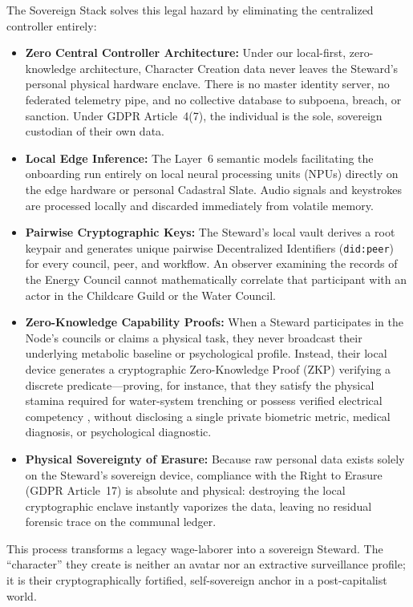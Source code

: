 The Sovereign Stack solves this legal hazard by eliminating the centralized controller entirely:
\begin{itemize}
    \item \textbf{Zero Central Controller Architecture:} Under our local-first, zero-knowledge architecture, Character Creation data never leaves the Steward's personal physical hardware enclave. There is no master identity server, no federated telemetry pipe, and no collective database to subpoena, breach, or sanction. Under GDPR Article~4(7), the individual is the sole, sovereign custodian of their own data.
    \item \textbf{Local Edge Inference:} The Layer~6 semantic models facilitating the onboarding run entirely on local neural processing units (NPUs) directly on the edge hardware or personal Cadastral Slate. Audio signals and keystrokes are processed locally and discarded immediately from volatile memory.
    \item \textbf{Pairwise Cryptographic Keys:} The Steward's local vault derives a root keypair and generates unique pairwise Decentralized Identifiers (\texttt{did:peer}) for every council, peer, and workflow. An observer examining the records of the Energy Council cannot mathematically correlate that participant with an actor in the Childcare Guild or the Water Council.
    \item \textbf{Zero-Knowledge Capability Proofs:} When a Steward participates in the Node's councils or claims a physical task, they never broadcast their underlying metabolic baseline or psychological profile. Instead, their local device generates a cryptographic Zero-Knowledge Proof (ZKP) verifying a discrete predicate---proving, for instance, that they satisfy the physical stamina required for water-system trenching or possess verified electrical competency \parencite{w3c2022vc}, without disclosing a single private biometric metric, medical diagnosis, or psychological diagnostic.
    \item \textbf{Physical Sovereignty of Erasure:} Because raw personal data exists solely on the Steward's sovereign device, compliance with the Right to Erasure (GDPR Article~17) is absolute and physical: destroying the local cryptographic enclave instantly vaporizes the data, leaving no residual forensic trace on the communal ledger.
\end{itemize}

This process transforms a legacy wage-laborer into a sovereign Steward. The ``character'' they create is neither an avatar nor an extractive surveillance profile; it is their cryptographically fortified, self-sovereign anchor in a post-capitalist world.


